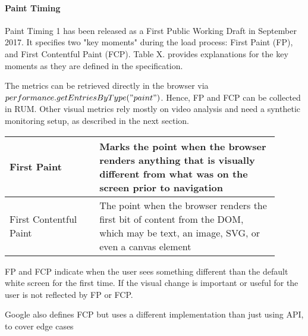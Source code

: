 

\paragraph{Paint Timing}

Paint Timing 1 has been released as a First Public Working Draft in September 2017.  
It specifies two "key moments" during the load process: First Paint (FP), and First Contentful Paint (FCP).
Table X. provides explanations for the key moments as they are defined in the specification. %

The metrics can be retrieved directly in the browser via $performance.getEntriesByType("paint")$.
Hence, FP and FCP can be collected in RUM.
Other visual metrics rely mostly on video analysis and need a synthetic monitoring setup, as described in the next section.

\begin{center}
\small
	\begin{tabular}{ | p{0.3\linewidth} | p{0.6\linewidth} | }
	\hline
	First Paint & Marks the point when the browser renders anything that is visually different from what was on the screen prior to navigation \\ 
	\hline
	First Contentful Paint & The point when the browser renders the first bit of content from the DOM, which may be text, an image, SVG, or even a canvas element \\  
	\hline
	\end{tabular}
\end{center}


FP and FCP indicate when the user sees something different than the default white screen for the first time.
If the visual change is important or useful for the user is not reflected by FP or FCP. %


Google also defines FCP but uses a different implementation than just using API, to cover edge cases







